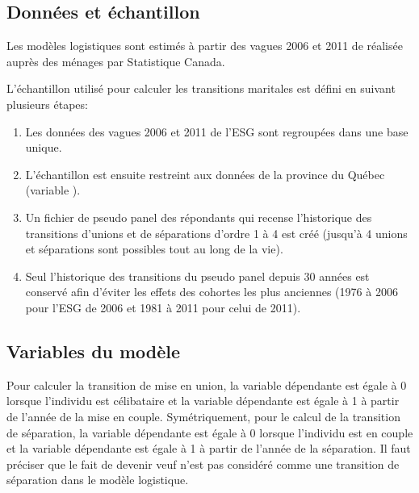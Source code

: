 \documentclass[letterpaper,10pt,french]{sphinxmanual}
\begin{document}
\subsection{Données et échantillon}
\label{\detokenize{methodologie:id8}}
Les modèles logistiques sont estimés à partir des vagues 2006 et 2011 de  réalisée auprès des ménages par Statistique Canada.

L’échantillon utilisé pour calculer les transitions maritales est défini en suivant plusieurs étapes:
\begin{enumerate}
%
\item {} 
Les données des vagues 2006 et 2011 de l’ESG sont regroupées dans une base unique.

\item {} 
L’échantillon est ensuite restreint aux données de la province du Québec (variable ).

\item {} 
Un fichier de pseudo panel des répondants qui recense l’historique des transitions d’unions et de séparations d’ordre 1 à 4 est créé (jusqu’à 4 unions et séparations sont possibles tout au long de la vie).

\item {} 
Seul l’historique des transitions du pseudo panel depuis 30 années est conservé afin d’éviter les effets des cohortes les plus anciennes (1976 à 2006 pour l’ESG de 2006 et 1981 à 2011 pour celui de 2011).

\end{enumerate}


\subsection{Variables du modèle}
\label{\detokenize{methodologie:id10}}
Pour calculer la transition de mise en union, la variable dépendante est égale à 0 lorsque l’individu est célibataire et la variable dépendante est égale à 1 à partir de l’année de la mise en couple. Symétriquement, pour le calcul de la transition de séparation, la variable dépendante est égale à 0 lorsque l’individu est en couple et la variable dépendante est égale à 1 à partir de l’année de la séparation. Il faut préciser que le fait de devenir veuf n’est pas considéré comme une transition de séparation dans le modèle logistique.
\end{document}
